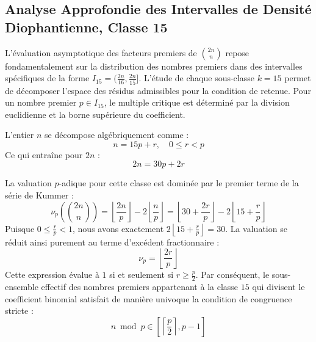 \documentclass[12pt,a4paper]{article}
\begin{document}
    \newpage
    \subsection{Analyse Approfondie des Intervalles de Densité Diophantienne, Classe 15}
    L'évaluation asymptotique des facteurs premiers de $\binom{2n}{n}$ repose fondamentalement sur la distribution des nombres premiers dans des intervalles spécifiques de la forme $I_15 = (\frac{2n}{16}, \frac{2n}{15}]$.
    L'étude de chaque sous-classe $k = 15$ permet de décomposer l'espace des résidus admissibles pour la condition de retenue.
    Pour un nombre premier $p \in I_15$, le multiple critique est déterminé par la division euclidienne et la borne supérieure du coefficient.

    L'entier $n$ se décompose algébriquement comme :
    \begin{equation}
    n = 15 p + r, \quad 0 \le r < p
    \end{equation}
    Ce qui entraîne pour $2n$ :
    \begin{equation}
    2n = 30 p + 2r
    \end{equation}

    La valuation $p$-adique pour cette classe est dominée par le premier terme de la série de Kummer :
    \begin{equation}
    \nu_p\left( \binom{2n}{n} \right) = \left\lfloor \frac{2n}{p} \right\rfloor - 2 \left\lfloor \frac{n}{p} \right\rfloor = \left\lfloor 30 + \frac{2r}{p} \right\rfloor - 2 \left\lfloor 15 + \frac{r}{p} \right\rfloor
    \end{equation}
    Puisque $0 \le \frac{r}{p} < 1$, nous avons exactement $2 \left\lfloor 15 + \frac{r}{p} \right\rfloor = 30$.
    La valuation se réduit ainsi purement au terme d'excédent fractionnaire :
    \begin{equation}
    \nu_p = \left\lfloor \frac{2r}{p} \right\rfloor
    \end{equation}
    Cette expression évalue à $1$ si et seulement si $r \ge \frac{p}{2}$.
    Par conséquent, le sous-ensemble effectif des nombres premiers appartenant à la classe $15$ qui divisent le coefficient binomial satisfait de manière univoque la condition de congruence stricte :
    \begin{equation}
    n \bmod p \in \left[ \left\lceil \frac{p}{2} \right\rceil, p - 1 \right]
    \end{equation}
\end{document}
